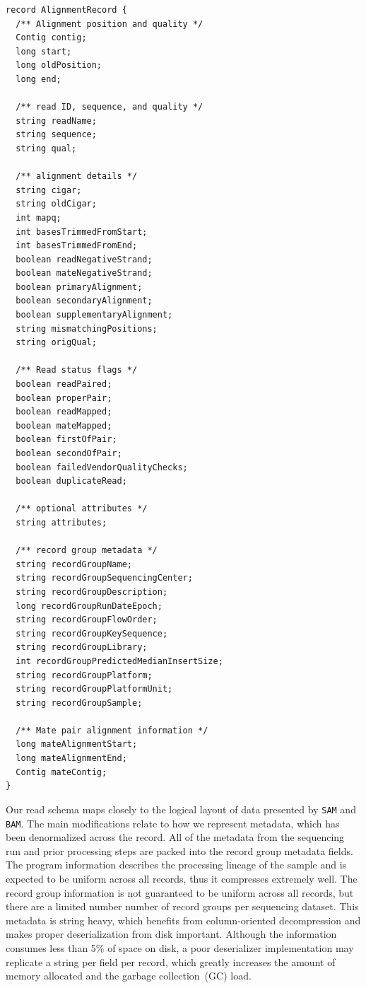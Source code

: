 \documentclass[phd]{ucbthesis}
\begin{document}
\begin{lstlisting}[caption=\texttt{ADAM} read schema]
record AlignmentRecord {
  /** Alignment position and quality */
  Contig contig;
  long start;
  long oldPosition;
  long end;

  /** read ID, sequence, and quality */
  string readName;
  string sequence;
  string qual;
  
  /** alignment details */
  string cigar;
  string oldCigar;
  int mapq;
  int basesTrimmedFromStart;
  int basesTrimmedFromEnd;
  boolean readNegativeStrand;
  boolean mateNegativeStrand;
  boolean primaryAlignment;
  boolean secondaryAlignment;
  boolean supplementaryAlignment;
  string mismatchingPositions;
  string origQual;

  /** Read status flags */
  boolean readPaired;
  boolean properPair;
  boolean readMapped;
  boolean mateMapped;
  boolean firstOfPair;
  boolean secondOfPair;
  boolean failedVendorQualityChecks;
  boolean duplicateRead;

  /** optional attributes */
  string attributes;

  /** record group metadata */
  string recordGroupName;
  string recordGroupSequencingCenter;
  string recordGroupDescription;
  long recordGroupRunDateEpoch;
  string recordGroupFlowOrder;
  string recordGroupKeySequence;
  string recordGroupLibrary;
  int recordGroupPredictedMedianInsertSize;
  string recordGroupPlatform;
  string recordGroupPlatformUnit;
  string recordGroupSample;

  /** Mate pair alignment information */
  long mateAlignmentStart;
  long mateAlignmentEnd;
  Contig mateContig;
}
\end{lstlisting}

Our read schema maps closely to the logical layout of data presented by \texttt{SAM} and \texttt{BAM}.
The main modifications relate to how we represent metadata, which has been denormalized across the record.
All of the metadata from the sequencing run and prior processing steps are packed into the record
group metadata fields. The program information describes the processing lineage of the sample and
is expected to be uniform across all records, thus it compresses extremely well. The record group
information is not guaranteed to be uniform across all records, but there are a limited number number
of record groups per sequencing dataset. This
metadata is string heavy, which benefits from column-oriented decompression and makes proper deserialization from disk important. Although the
information consumes less than 5\% of space on disk, a poor deserializer implementation may replicate
a string per field per record, which greatly increases the amount of memory allocated and the garbage
collection~(GC) load.
\end{document}
